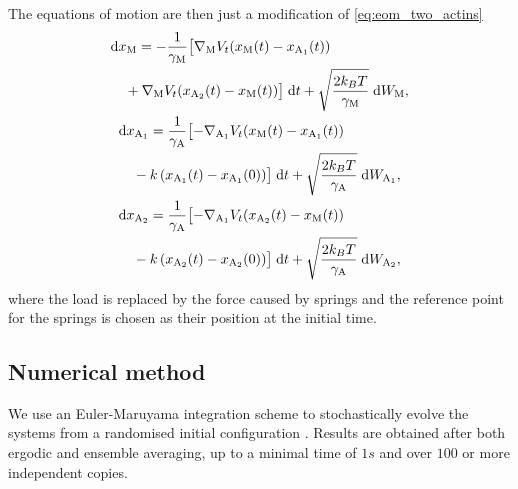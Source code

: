 \documentclass[aps,pre,twocolumn,showpacs,showkeys,superscriptaddress,floatfix]{revtex4-1}
\newcommand{\rmd}{{\mathrm d}}
\begin{document}
The equations of motion are then just a modification of \eqref{eq:eom_two_actins}  
\begin{equation}
\begin{gathered}
\begin{multlined}[b][.45\textwidth]
\rmd x_\text{M} = 
- \frac{1}{\gamma_\text{M}} \bigl[ \nabla_\text{M} V_t(x_\text{M}(t) - x_{\text{A}_1}(t)) 
\\
+ \nabla_\text{M} V_t(x_{\text{A}_2}(t) - x_\text{M}(t)) \bigr] \; \rmd t 
+ \sqrt{ \frac{2 k_B T}{\gamma_\text{M}} } \; \rmd W_\text{M} ,
\end{multlined}\\
\begin{multlined}[b][.45\textwidth]
\rmd x_{\text{A}_1} = 
\frac{1}{\gamma_\text{A}} \bigl[ - \nabla_{\text{A}_1} V_t(x_\text{M}(t) - x_{\text{A}_1}(t)) 
\\
- k \left( x_{\text{A}_1}(t) - x_{\text{A}_1}(0) \right) \bigr] \; \rmd t 
+ \sqrt{ \frac{2 k_B T}{\gamma_\text{A}} } \; \rmd W_{\text{A}_1} ,
\end{multlined}\\
\begin{multlined}[b][.45\textwidth]
\rmd x_{\text{A}_2} = 
\frac{1}{\gamma_\text{A}} \bigl[ - \nabla_{\text{A}_1} V_t(x_{\text{A}_2}(t) - x_\text{M}(t))
\\
- k \left( x_{\text{A}_2}(t) - x_{\text{A}_2}(0) \right) \bigr] \; \rmd t 
+ \sqrt{ \frac{2 k_B T}{\gamma_\text{A}} } \; \rmd W_{\text{A}_2} ,
\end{multlined}
\end{gathered}
\label{eq:eom_two_actins_no_load}
\end{equation}
where the load is replaced by the force caused by springs and the reference point for the springs is chosen as their position at the initial time. 

\subsection{Numerical method}

We use an Euler-Maruyama integration scheme to stochastically evolve the systems from a randomised initial configuration \cite{kloeden1989survey,maruyama1955continuous}. 
Results are obtained after both ergodic and ensemble averaging, up to a minimal time of $1s$ and over $100$ or more independent copies.    
\end{document}
